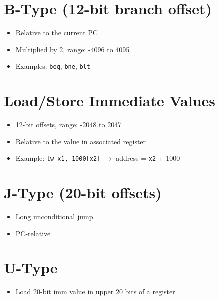 \documentclass{article}
\begin{document}
\section*{B-Type (12-bit branch offset)}
\begin{itemize}
    \item Relative to the current PC
    \item Multiplied by 2, range: -4096 to 4095
    \item Examples: \texttt{beq}, \texttt{bne}, \texttt{blt}
\end{itemize}

\section*{Load/Store Immediate Values}
\begin{itemize}
    \item 12-bit offsets, range: -2048 to 2047
    \item Relative to the value in associated register
    \item Example: \texttt{lw x1, 1000[x2]} $\rightarrow$ address = \texttt{x2} + 1000
\end{itemize}

\section*{J-Type (20-bit offsets)}
\begin{itemize}
    \item Long unconditional jump
    \item PC-relative
\end{itemize}

\section*{U-Type}
\begin{itemize}
    \item Load 20-bit imm value in upper 20 bits of a register
\end{itemize}


\renewcommand{\arraystretch}{2} %
\end{document}
